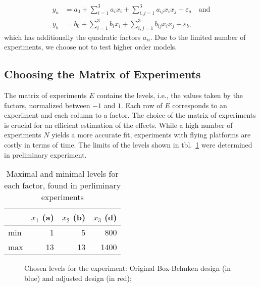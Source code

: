 \begin{subequations}\label{eq:model_quadr}
\begin{align}
	y_a &= a_0 + \displaystyle\sum_{i=1}^{3} a_i x_i + \displaystyle\sum_{i,j=1}^{3} a_{ij} x_i x_j + \varepsilon_a \quad \text{and}\\ 
	y_b &= b_0 + \displaystyle\sum_{i=1}^{3} b_i x_i + \displaystyle\sum_{i,j=1}^{3} b_{ij} x_i x_j + \varepsilon_b,
\end{align}
\end{subequations}
which has additionally the quadratic factors $a_{ii}$.
Due to the limited number of experiments, we choose not to test higher order models.

\subsection{Choosing the Matrix of Experiments}
The matrix of experiments $E$ contains the levels, i.e., the values taken by the factors, normalized between $-1$ and $1$. Each row of $E$ corresponds to an experiment and each column to a factor. The choice of the matrix of experiments is crucial for an efficient estimation of the effects. While a high number of experiments $N$ yields a more accurate fit, experiments with flying platforms are costly in terms of time. The limits of the levels shown in tbl.~\ref{tbl:levels} were determined in preliminary experiment.
\begin{table}[h!]
	\centering
	\begin{tabular}{l r r r}
	 & $x_1$ (a) & $x_2$ (b) & $x_3$ (d) \\\hline
	min & 1 & 5 & 800\\
	max & 13 & 13 & 1400 \\
	\end{tabular}
	\caption{Maximal and minimal levels for each factor, found in perliminary experiments}\label{tbl:levels}
\end{table}
\begin{figure}[h]
    \centering
	\setlength{\abovecaptionskip}{1pt plus 3pt minus 0pt}
	\setlength{\figH}{0.25\textwidth}
	
    \caption{Chosen levels for the experiment: Original Box-Behnken design (in blue) and adjusted design (in red);}\label{fig:design}
\end{figure} 

